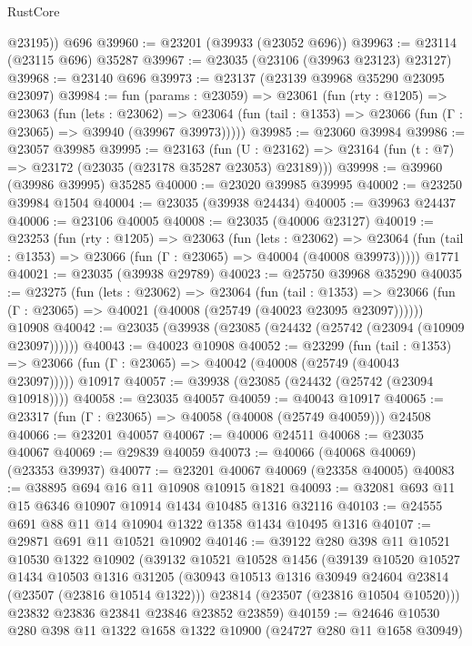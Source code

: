 \begin{lexlean}{RustCore}
\begin{coremodule}
        @23195))
    @696
@39960 := @23201 (@39933 (@23052 @696))
@39963 := @23114 (@23115 @696) @35287
@39967 := @23035 (@23106 (@39963 @23123) @23127)
@39968 := @23140 @696
@39973 := @23137 (@23139 @39968 @35290 @23095 @23097)
@39984 := fun (params : @23059) =>
  @23061
    (fun (rty : @1205) =>
    @23063
      (fun (lets : @23062) =>
      @23064 (fun (tail : @1353) => @23066 (fun (Γ : @23065) => @39940 (@39967 @39973)))))
@39985 := @23060 @39984
@39986 := @23057 @39985
@39995 := @23163
    (fun (U : @23162) => @23164 (fun (t : @7) => @23172 (@23035 (@23178 @35287 @23053) @23189)))
@39998 := @39960 (@39986 @39995) @35285
@40000 := @23020 @39985 @39995
@40002 := @23250 @39984 @1504
@40004 := @23035 (@39938 @24434)
@40005 := @39963 @24437
@40006 := @23106 @40005
@40008 := @23035 (@40006 @23127)
@40019 := @23253
    (fun (rty : @1205) =>
    @23063
      (fun (lets : @23062) =>
      @23064 (fun (tail : @1353) => @23066 (fun (Γ : @23065) => @40004 (@40008 @39973)))))
    @1771
@40021 := @23035 (@39938 @29789)
@40023 := @25750 @39968 @35290
@40035 := @23275
    (fun (lets : @23062) =>
    @23064
      (fun (tail : @1353) =>
      @23066 (fun (Γ : @23065) => @40021 (@40008 (@25749 (@40023 @23095 @23097))))))
    @10908
@40042 := @23035 (@39938 (@23085 (@24432 (@25742 (@23094 (@10909 @23097))))))
@40043 := @40023 @10908
@40052 := @23299
    (fun (tail : @1353) => @23066 (fun (Γ : @23065) => @40042 (@40008 (@25749 (@40043 @23097)))))
    @10917
@40057 := @39938 (@23085 (@24432 (@25742 (@23094 @10918))))
@40058 := @23035 @40057
@40059 := @40043 @10917
@40065 := @23317 (fun (Γ : @23065) => @40058 (@40008 (@25749 @40059))) @24508
@40066 := @23201 @40057
@40067 := @40006 @24511
@40068 := @23035 @40067
@40069 := @29839 @40059
@40073 := @40066 (@40068 @40069) (@23353 @39937)
@40077 := @23201 @40067 @40069 (@23358 @40005)
@40083 := @38895 @694 @16 @11 @10908 @10915 @1821
@40093 := @32081 @693 @11 @15 @6346 @10907 @10914 @1434 @10485 @1316 @32116
@40103 := @24555 @691 @88 @11 @14 @10904 @1322 @1358 @1434 @10495 @1316
@40107 := @29871 @691 @11 @10521 @10902
@40146 := @39122
    @280
    @398
    @11
    @10521
    @10530
    @1322
    @10902
    (@39132
      @10521
      @10528
      @1456
      (@39139
        @10520
        @10527
        @1434
        @10503
        @1316
        @31205
        (@30943 @10513 @1316 @30949 @24604 @23814 (@23507 (@23816 @10514 @1322)))
        @23814
        (@23507 (@23816 @10504 @10520)))
      @23832
      @23836
      @23841
      @23846
      @23852
      @23859)
@40159 := @24646 @10530 @280 @398 @11 @1322 @1658 @1322 @10900 (@24727 @280 @11 @1658 @30949)

\end{coremodule}
\end{lexlean}
